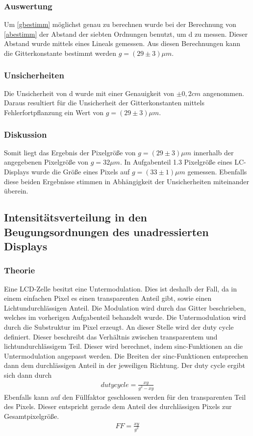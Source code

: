 \subsubsection{Auswertung}
Um \cref{gbestimm} möglichst genau zu berechnen wurde bei der Berechnung von \cref{abestimm} der Abstand der siebten Ordnungen benutzt, um d zu messen. Dieser Abstand wurde mittels eines Lineals gemessen. Aus diesen Berechnungen kann die Gitterkonstante bestimmt werden $g = (29 \pm 3) \mu m$.
\subsubsection{Unsicherheiten}
Die Unsicherheit von d wurde mit einer Genauigkeit von $\pm 0,2cm$ angenommen. Daraus resultiert für die Unsicherheit der Gitterkonstanten mittels Fehlerfortpflanzung ein Wert von $g = (29 \pm 3) \mu m$.
\subsubsection{Diskussion}
Somit liegt das Ergebnis der Pixelgröße von $g = (29 \pm 3) \mu m$ innerhalb der angegebenen Pixelgröße von $g = 32 \mu m$. In Aufgabenteil 1.3 Pixelgröße eines LC-Displays wurde die Größe eines Pixels auf $g = (33 \pm 1) \mu m$ gemessen. Ebenfalls diese beiden Ergebnisse stimmen in Abhängigkeit der Unsicherheiten miteinander überein.

\subsection{Intensitätsverteilung in den Beugungsordnungen des unadressierten Displays}
\subsubsection{Theorie}
Eine LCD-Zelle besitzt eine Untermodulation. Dies ist deshalb der Fall, da in einem einfachen Pixel es einen transparenten Anteil gibt, sowie einen Lichtundurchlässigen Anteil. Die Modulation wird durch das Gitter beschrieben, welches im vorherigen Aufgabenteil behandelt wurde. Die Untermodulation wird durch die Substruktur im Pixel erzeugt. An dieser Stelle wird der duty cycle definiert. Dieser beschreibt das Verhältnis zwischen transparentem und lichtundurchlässigem Teil. 
Dieser wird berechnet, indem sinc-Funktionen an die Untermodulation angepasst werden. Die Breiten der sinc-Funktionen entsprechen dann dem durchlässigen Anteil in der jeweiligen Richtung. 
Der duty cycle ergibt sich dann durch
\begin{align}
	duty cycle = \frac{xy}{g^{2}-xy}
	\label{dutycyc}
\end{align}
Ebenfalls kann auf den Füllfaktor geschlossen werden für den transparenten Teil des Pixels. Dieser entspricht gerade dem Anteil des durchlässigen Pixels zur Gesamtpixelgröße.
\begin{align}
	FF = \frac{xy}{g^{2}}
	\label{ff}
\end{align}

